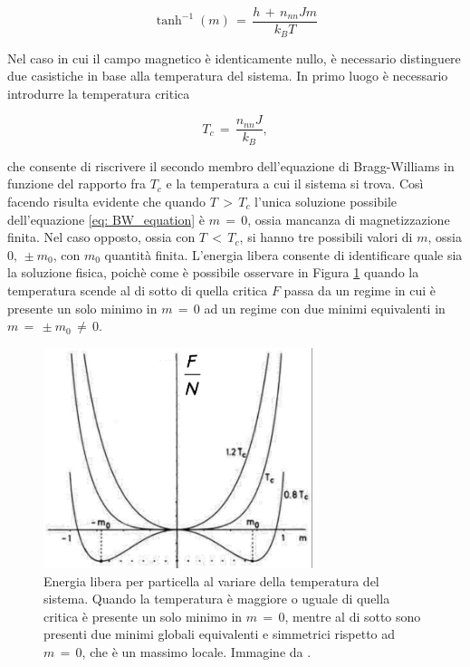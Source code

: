\begin{equation}
    \tanh^{-1}{\left(m\right)}\,=\,\frac{h\,+\,n_{nn}Jm}{k_B T}
    \label{eq: BW_equation}
\end{equation}

Nel caso in cui il campo magnetico è identicamente nullo, è necessario distinguere due casistiche in base alla temperatura del sistema. 
In primo luogo è necessario introdurre la temperatura critica 

\begin{equation}
    T_c\,=\,\frac{n_{nn}J}{k_B},
    \label{eq: tc_Ising1D_MF}
\end{equation}

che consente di riscrivere il secondo membro dell'equazione di Bragg-Williams in funzione del rapporto fra $T_c$ e la temperatura 
a cui il sistema si trova. Così facendo risulta evidente che quando $T\,>\,T_c$ l'unica soluzione possibile dell'equazione 
\eqref{eq: BW_equation} è $m\,=\,0$, ossia mancanza di magnetizzazione finita. Nel caso opposto, ossia con $T\,<\,T_c$, si hanno 
tre possibili valori di $m$, ossia $0,\,\pm m_0$, con $m_0$ quantità finita. L'energia libera consente di identificare quale 
sia la soluzione fisica, poichè come è possibile osservare in Figura \ref{fig: FE_Ising1D_MF} quando la temperatura scende al 
di sotto di quella critica $F$ passa da un regime in cui è presente un solo minimo in $m\,=\,0$ ad un regime con due minimi 
equivalenti in $m\,=\,\pm m_0\,\neq\,0$. 

\begin{figure}[h!]
    \centering
    \includegraphics[width=0.7\textwidth]{Immagini/FE_Ising1D_MF.png}
    \caption{ Energia libera per particella al variare della temperatura del sistema. Quando la temperatura è maggiore o uguale 
    di quella critica è presente un solo minimo in $m\,=\,0$, mentre al di sotto sono presenti due minimi globali equivalenti e 
    simmetrici rispetto ad $m\,=\,0$, che è un massimo locale. Immagine da \cite{galliFSA}.}
    \label{fig: FE_Ising1D_MF}
\end{figure}


